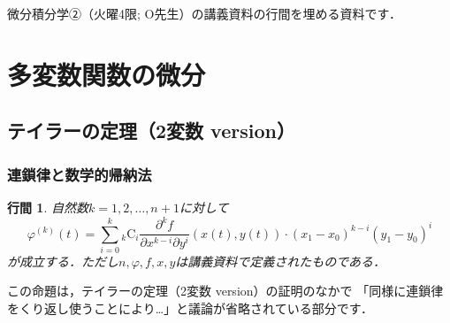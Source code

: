 \documentclass[uplatex]{jsarticle}
\newtheorem{proposition}{行間}
\newcommand{\combination}[2]{{}_{#1} \mathrm{C}_{#2}}
\begin{document}
微分積分学②（火曜4限; O先生）の講義資料の行間を埋める資料です．
\setcounter{tocdepth}{3}
\tableofcontents
\newpage

\setcounter{section}{1}
\section{多変数関数の微分}
\setcounter{subsection}{7}
\subsection{テイラーの定理（2変数 version）}

\subsubsection{連鎖律と数学的帰納法}
\begin{screen}
    \begin{proposition}
        自然数$k=1,2,\dots,n+1$に対して
        \begin{equation}
            \label{proposition:1}
            \varphi^{(k)}(t)
            =
            \sum_{i=0}^{k}
                \combination{k}{i}
                \frac{\partial^k f}{\partial x^{k-i} \partial y^{i}} (x(t), y(t))
                \cdot
                (x_1 - x_0)^{k-i}
                (y_1 - y_0)^{i}
        \end{equation}
        が成立する．ただし$n, \varphi, f, x, y$は講義資料で定義されたものである．
    \end{proposition}
\end{screen}

この命題は，テイラーの定理（2変数 version）の証明のなかで
「同様に連鎖律をくり返し使うことにより…」と議論が省略されている部分です．
\end{document}
